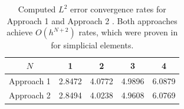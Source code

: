 \documentclass{svjour3}                     %
\begin{document}
\begin{table}
\centering
\begin{tabular}{|c||c|c|c|c|}
\hline
$N$ & 1 & 2 & 3 & 4\\
\hline
Approach 1 &2.8472  & 4.0772 &4.9896 & 6.0879 \\
\hline
Approach 2 & 2.8494  & 4.0238 & 4.9608 & 6.0769  \\
\hline
\end{tabular}
\caption{Computed $L^2$ error convergence rates for Approach 1 \cite{kopriva2006metric} and Approach 2 \cite{kozdon2018energy}.  Both approaches achieve $O(h^{N+2})$ rates, which were proven in \cite{chan2018discretely, crean2018entropy} for simplicial elements.}
\label{fig:geo_rates}
\end{table}




\end{document}
